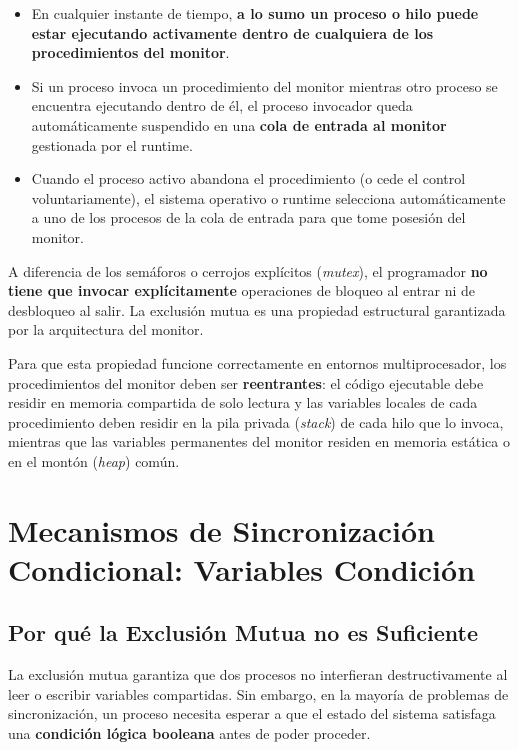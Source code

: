 \begin{itemize}[leftmargin=*]
    \item En cualquier instante de tiempo, \textbf{a lo sumo un proceso o hilo puede estar ejecutando activamente dentro de cualquiera de los procedimientos del monitor}.
    \item Si un proceso invoca un procedimiento del monitor mientras otro proceso se encuentra ejecutando dentro de él, el proceso invocador queda automáticamente suspendido en una \textbf{cola de entrada al monitor} gestionada por el runtime.
    \item Cuando el proceso activo abandona el procedimiento (o cede el control voluntariamente), el sistema operativo o runtime selecciona automáticamente a uno de los procesos de la cola de entrada para que tome posesión del monitor.
\end{itemize}

\begin{aviso}
A diferencia de los semáforos o cerrojos explícitos (\emph{mutex}), el programador \textbf{no tiene que invocar explícitamente} operaciones de bloqueo al entrar ni de desbloqueo al salir. La exclusión mutua es una propiedad estructural garantizada por la arquitectura del monitor.
\end{aviso}

Para que esta propiedad funcione correctamente en entornos multiprocesador, los procedimientos del monitor deben ser \textbf{reentrantes}: el código ejecutable debe residir en memoria compartida de solo lectura y las variables locales de cada procedimiento deben residir en la pila privada (\emph{stack}) de cada hilo que lo invoca, mientras que las variables permanentes del monitor residen en memoria estática o en el montón (\emph{heap}) común.

\section{Mecanismos de Sincronización Condicional: Variables Condición}

\subsection{Por qué la Exclusión Mutua no es Suficiente}
La exclusión mutua garantiza que dos procesos no interfieran destructivamente al leer o escribir variables compartidas. Sin embargo, en la mayoría de problemas de sincronización, un proceso necesita esperar a que el estado del sistema satisfaga una \textbf{condición lógica booleana} antes de poder proceder.

